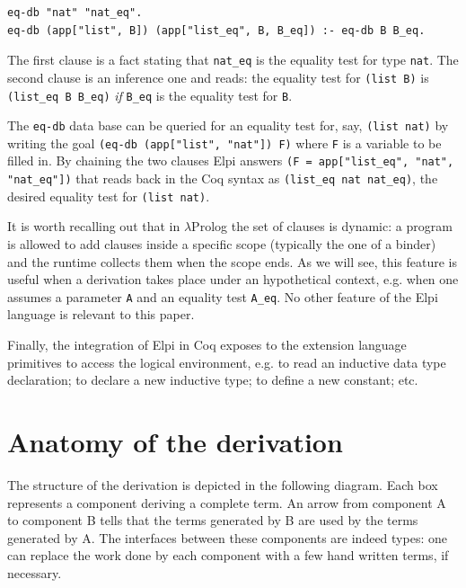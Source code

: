 \documentclass[a4paper,UKenglish,cleveref, autoref]{lipics-v2019}
\begin{document}
\begin{lstlisting}
eq-db "nat" "nat_eq".
eq-db (app["list", B]) (app["list_eq", B, B_eq]) :- eq-db B B_eq.
\end{lstlisting}

The first clause is a fact stating that
\lstinline+nat_eq+ is the equality test for type
\lstinline+nat+.
The second clause is an inference one and reads: the equality test
for \lstinline+(list B)+ is \lstinline+(list_eq B B_eq)+ \emph{if}
\lstinline+B_eq+ is the equality test for \lstinline+B+.

The \lstinline+eq-db+ data base can be queried for
an equality test for, say, \lstinline+(list nat)+ by writing
the goal \lstinline+(eq-db (app["list", "nat"]) F)+
where \lstinline+F+ is a variable to be filled in.
By chaining the two clauses Elpi answers
\lstinline+(F = app["list_eq", "nat", "nat_eq"])+
that reads back in the Coq syntax as
\lstinline+(list_eq nat nat_eq)+, the desired
equality test for \lstinline+(list nat)+.

It is worth recalling out that in $\lambda$Prolog the set of clauses
is dynamic: a program is allowed to add clauses inside
a specific scope (typically the one of a binder) and the runtime
collects them when the scope ends. As we will see, this feature
is useful when a derivation takes place under an hypothetical
context, e.g. when one assumes a parameter \lstinline+A+ and
an equality test \lstinline+A_eq+.
No other feature of the Elpi language is relevant to this paper.

Finally, the integration of Elpi in Coq exposes to the extension
language primitives to access the logical environment, e.g.
to read an inductive data type declaration; to declare a
new inductive type; to define a new constant; etc.

\section{Anatomy of the derivation} %
\label{sec:code}

The structure of the derivation is depicted in the following diagram.
Each box represents a component deriving a complete term.
An arrow from component A to component B tells that the terms
generated by B are used by the terms generated by A. The interfaces
between these components are indeed types: one can replace the work
done by each component with a few hand written terms, if necessary.
\end{document}

